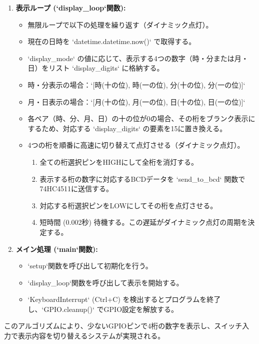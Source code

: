 \documentclass[a4paper,11pt,dvipdfmx]{jsarticle}
\begin{document}
\begin{enumerate}
    \item \textbf{表示ループ (`display\_loop`関数):}
    \begin{itemize}
        \item 無限ループで以下の処理を繰り返す（ダイナミック点灯）。
        \item 現在の日時を `datetime.datetime.now()` で取得する。
        \item `display\_mode` の値に応じて、表示する4つの数字（時・分または月・日）をリスト `display\_digits` に格納する。
        \item 時・分表示の場合：`[時(十の位), 時(一の位), 分(十の位), 分(一の位)]`
        \item 月・日表示の場合：`[月(十の位), 月(一の位), 日(十の位), 日(一の位)]`
        \item 各ペア（時、分、月、日）の十の位が0の場合、その桁をブランク表示にするため、対応する `display\_digits` の要素を15に置き換える。
        \item 4つの桁を順番に高速に切り替えて点灯させる（ダイナミック点灯）。
        \begin{enumerate}
            \item 全ての桁選択ピンをHIGHにして全桁を消灯する。
            \item 表示する桁の数字に対応するBCDデータを `send\_to\_bcd` 関数で74HC4511に送信する。
            \item 対応する桁選択ピンをLOWにしてその桁を点灯させる。
            \item 短時間 (0.002秒) 待機する。この遅延がダイナミック点灯の周期を決定する。
        \end{enumerate}
    \end{itemize}
    \item \textbf{メイン処理 (`main`関数):}
    \begin{itemize}
        \item `setup`関数を呼び出して初期化を行う。
        \item `display\_loop`関数を呼び出して表示を開始する。
        \item `KeyboardInterrupt` (Ctrl+C) を検出するとプログラムを終了し、`GPIO.cleanup()` でGPIO設定を解放する。
    \end{itemize}
\end{enumerate}
このアルゴリズムにより、少ないGPIOピンで4桁の数字を表示し、スイッチ入力で表示内容を切り替えるシステムが実現される。
\end{document}
